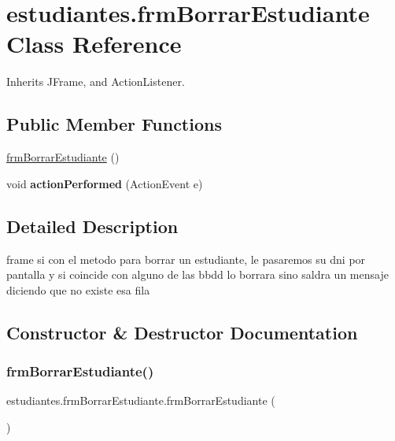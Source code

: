 \hypertarget{classestudiantes_1_1frm_borrar_estudiante}{}\section{estudiantes.\+frm\+Borrar\+Estudiante Class Reference}
\label{classestudiantes_1_1frm_borrar_estudiante}


Inherits J\+Frame, and Action\+Listener.

\subsection*{Public Member Functions}
\begin{DoxyCompactItemize}
\item 
\hyperlink{classestudiantes_1_1frm_borrar_estudiante_a10d69fe674dab03ebfe5d90694b85c83}{frm\+Borrar\+Estudiante} ()
\item 
\mbox{\label{classestudiantes_1_1frm_borrar_estudiante_ae20c3c450ef9b621ad19c450d89bb232}} 
void {\bfseries action\+Performed} (Action\+Event e)
\end{DoxyCompactItemize}


\subsection{Detailed Description}
frame si con el metodo para borrar un estudiante, le pasaremos su dni por pantalla y si coincide con alguno de las bbdd lo borrara sino saldra un mensaje diciendo que no existe esa fila 

\subsection{Constructor \& Destructor Documentation}
\mbox{\label{classestudiantes_1_1frm_borrar_estudiante_a10d69fe674dab03ebfe5d90694b85c83}} 
\subsubsection{\texorpdfstring{frm\+Borrar\+Estudiante()}{frmBorrarEstudiante()}}
{\footnotesize\ttfamily estudiantes.\+frm\+Borrar\+Estudiante.\+frm\+Borrar\+Estudiante (\begin{DoxyParamCaption}{ }\end{DoxyParamCaption})}

